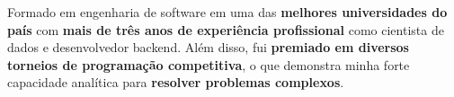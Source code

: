 \documentclass[a4paper,12pt]{article}
\begin{document}

Formado em engenharia de software em uma das \textbf{melhores universidades do país}
com \textbf{mais de três anos de experiência profissional} como cientista de dados e desenvolvedor backend.
Além disso, fui \textbf{premiado em diversos torneios de programação competitiva}, o que demonstra minha forte
capacidade analítica para \textbf{resolver problemas complexos}.
\end{document}
